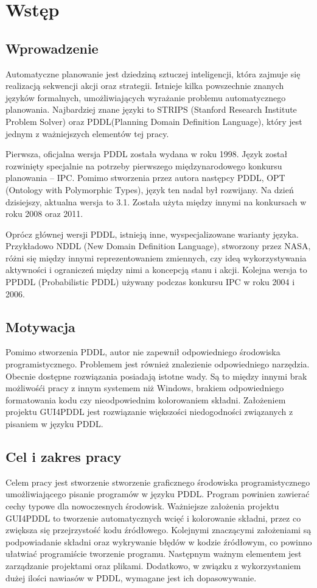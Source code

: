 \chapter{Wstęp}
\section{Wprowadzenie}
	Automatyczne planowanie jest dziedziną sztuczej inteligencji, która zajmuje się realizacją sekwencji akcji oraz strategii. Istnieje kilka powszechnie znanych języków formalnych, umożliwiających wyrażanie problemu automatycznego planowania. Najbardziej znane języki to STRIPS (Stanford Research Institute Problem Solver) oraz PDDL(Planning Domain Definition Language), który jest jednym z ważniejszych elementów tej pracy.
	
	Pierwsza, oficjalna wersja PDDL została wydana w roku 1998.  Język został rozwinięty specjalnie na potrzeby pierwszego międzynarodowego konkursu planowania – IPC. Pomimo stworzenia przez autora następcy PDDL, OPT (Ontology with Polymorphic Types), język ten nadal był rozwijany. Na dzień dzisiejszy, aktualna wersja to 3.1. Została użyta między innymi na konkursach w roku 2008 oraz 2011.

	Oprócz głównej wersji PDDL, istnieją  inne, wyspecjalizowane warianty języka. Przykładowo  NDDL (New Domain Definition Language), stworzony przez NASA, różni się między innymi reprezentowaniem zmiennych, czy ideą wykorzystywania aktywności i ograniczeń między nimi a koncepcją stanu i akcji. Kolejna wersja to PPDDL (Probabilistic PDDL) używany podczas konkursu IPC w roku 2004 i 2006.


\section{Motywacja}
Pomimo stworzenia PDDL, autor nie zapewnił odpowiedniego środowiska programistycznego. Problemem jest również znalezienie odpowiedniego narzędzia. Obecnie dostępne rozwiązania posiadają istotne wady. Są to między innymi brak możliwośći pracy z innym systemem  niż Windows, brakiem odpowiedniego formatowania kodu czy nieodpowiednim kolorowaniem składni. Założeniem projektu GUI4PDDL jest rozwiązanie większości niedogodności związanych z pisaniem w języku PDDL.
\section{Cel i zakres pracy}
Celem pracy jest stworzenie stworzenie graficznego środowiska programistycznego umożliwiającego pisanie programów w języku PDDL. Program powinien zawierać cechy typowe dla nowoczesnych środowisk. Ważniejsze założenia projektu GUI4PDDL to tworzenie automatycznych wcięć i kolorowanie składni, przez co zwiększa się przejrzystość kodu źródłowego. Kolejnymi znaczącymi założeniami są podpowiadanie składni oraz wykrywanie błędów w kodzie źródłowym, co powinno ułatwiać programiście tworzenie programu. Następnym ważnym elementem jest zarządzanie projektami oraz plikami. Dodatkowo, w związku z wykorzystaniem dużej ilości nawiasów w PDDL, wymagane jest ich dopasowywanie. 

